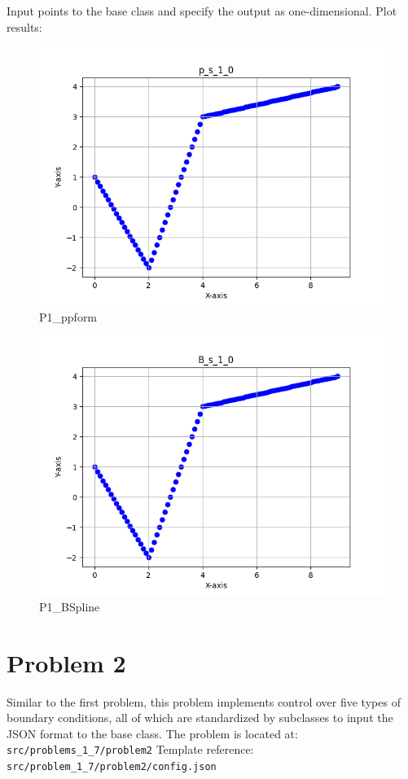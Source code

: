 \documentclass[a4paper]{article}
\begin{document}
Input points to the base class and specify the output as one-dimensional.
Plot results:

\begin{figure}[H] 
    \centering
    \includegraphics{../figure/p_s_1_0.png}
    \caption{P1\_ppform}
\end{figure}

\begin{figure}[H] 
    \centering
    \includegraphics{../figure/B_s_1_0.png}
    \caption{P1\_BSpline}
\end{figure}

\section*{Problem 2}
Similar to the first problem, this problem implements control over five types of boundary conditions, all of which are standardized by subclasses to input the JSON format to the base class.
The problem is located at: \texttt{src/problems\_1\_7/problem2}
Template reference: \texttt{src/problem\_1\_7/problem2/config.json}
\end{document}
